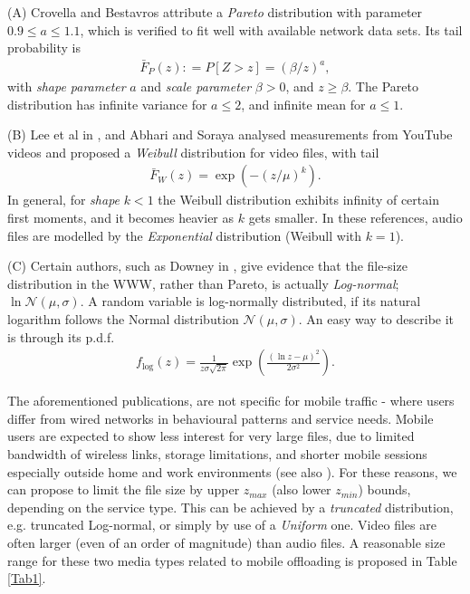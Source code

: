 \documentclass[conference]{IEEEtran}
\begin{document}
(A) Crovella and Bestavros \cite{CroBeSELF97} attribute a \textit{Pareto} distribution with parameter $0.9\leq a \leq 1.1$, which is verified to fit well with available network data sets. Its tail probability is
\begin{eqnarray}
\label{Pareto}
\bar{F}_{P}(z): = P\left[Z > z\right] = (\beta/z)^{a},
\end{eqnarray}
with  \textit{shape parameter} $a$ and \textit{scale parameter} $\beta > 0$, and $z\geq \beta$. The Pareto distribution has infinite variance for $a \leq 2$, and infinite mean for $a\leq 1$.

(B) Lee et al in \cite{NetWIFI13}, and Abhari and Soraya \cite{AbhariYouTube10} analysed measurements from YouTube videos and proposed a \textit{Weibull} distribution for video files, with tail
\begin{eqnarray}
\label{Weibull}
\bar{F}_{W}(z) = \exp(-(z/\mu)^{k}).
\end{eqnarray}
In general, for \textit{shape} $k<1$ the Weibull distribution exhibits infinity of certain first moments, and it becomes heavier as $k$ gets smaller. In these references, audio files are modelled by the \textit{Exponential} distribution (Weibull with $k=1$). 

(C) Certain authors, such as Downey in \cite{Dow01}, give evidence that the file-size distribution in the WWW, rather than Pareto, is actually \textit{Log-normal}; $\ln\mathcal{N}\left(\mu,\sigma\right)$. A random variable is log-normally distributed, if its natural logarithm follows the Normal distribution $\mathcal{N(\mu,\sigma)}$. An easy way to describe it is through its p.d.f.
\begin{eqnarray}
\label{lognormalpdf}
f_{\log}(z) = \frac{1}{z\sigma \sqrt{2\pi}}\exp\left(\frac{(\ln z - \mu)^2}{2\sigma^2}\right).
\end{eqnarray}




The aforementioned publications, are not specific for mobile traffic - where users differ from wired networks in behavioural patterns and service needs. Mobile users are expected to show less interest for very large files, due to limited bandwidth of wireless links, storage limitations, and shorter mobile sessions especially outside home and work environments (see also \cite{Arv12}). For these reasons, we can propose to limit the file size by upper $z_{max}$ (also lower $z_{min}$) bounds, depending on the service type. This can be achieved by a \textit{truncated} distribution, e.g. truncated Log-normal, or simply by use of a \textit{Uniform} one. Video files are often larger (even of an order of magnitude) than audio files. A reasonable size range for these two media types related to mobile offloading is proposed in Table \ref{Tab1}.
\end{document}
